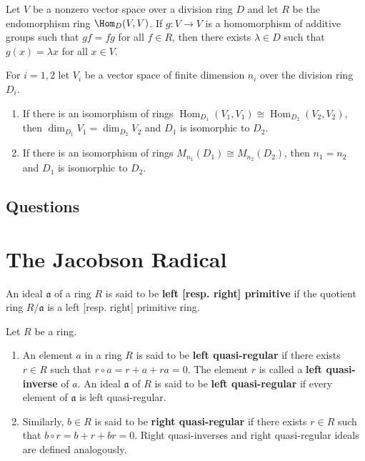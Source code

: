 \begin{lemma}
    Let $V$ be a nonzero vector space over a division ring $D$ and let $R$ be the endomorphism ring $\Hom_{D}(V, V)$.
    If $g: V \rightarrow V$ is a homomorphism of additive groups such that $gf=fg$ for all $f \in R$, then there exists $\lambda \in D$ such that $g(x)=\lambda x$ for all $x\in V$.
\end{lemma}

\begin{proposition}
    For $i=1,2$ let $V_{i}$ be a vector space of finite dimension $n_{i}$ over the division ring $D_{i}$.
    \begin{enumerate}
        \item
              If there is an isomorphism of rings $\operatorname{Hom}_{D_1}\left(V_1, V_1\right) \cong \operatorname{Hom}_{D_2}\left(V_2, V_2\right)$, then $\operatorname{dim}_{D_1} V_1=\operatorname{dim}_{D_2} V_2$ and $D_1$ is isomorphic to $D_2$.
        \item
              If there is an isomorphism of rings $M_{n_1} \left(D_1\right) \cong M_{n_2} \left(D_2\right)$, then $n_1=n_2$ and $D_1$ is isomorphic to $D_2$.
    \end{enumerate}
\end{proposition}


\subsection{Questions}





\section{The Jacobson Radical} %


\begin{definition}
    An ideal $\mathfrak{a}$ of a ring $R$ is said to be \textbf{left [resp. right] primitive} if the quotient ring $R / \mathfrak{a}$ is a left [resp. right] primitive ring.

\end{definition}

\begin{definition}
    Let $R$ be a ring.
    \begin{enumerate}
        \item
              An element $a$ in a ring $R$ is said to be  \textbf{left quasi-regular} if there exists $r \in R$ such that $r \circ a=r+a+ra=0$.
              The element $r$ is called a \textbf{left quasi-inverse} of $a$.
              An ideal $\mathfrak{a}$ of $R$ is said to be \textbf{left quasi-regular} if every element of $\mathfrak{a}$ is left quasi-regular.

        \item
              Similarly, $b \in R$ is said to be \textbf{right quasi-regular} if there exists $r \in R$ such that $b\circ r = b+r+br=0$. Right quasi-inverses and right quasi-regular ideals are defined analogously.
    \end{enumerate}
\end{definition}



